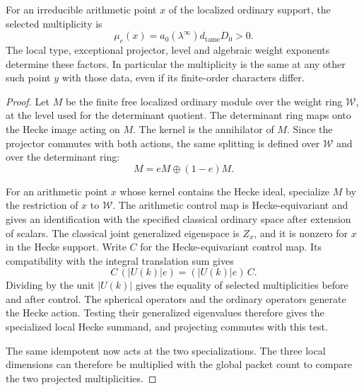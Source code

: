 \begin{proposition}\label{prop:ordinary-multiplicity-equal}
For an irreducible arithmetic point \(x\) of the localized
ordinary support, the selected multiplicity is
\[
 \mu_e(x)=a_0(\lambda^\infty)d_{\mathrm{tame}}D_0>0 .
\]
The local type, exceptional projector, level and algebraic
weight exponents determine these factors. In particular the
multiplicity is the same at any other such point \(y\) with
those data, even if its finite-order characters differ.
\end{proposition}

\begin{proof}
Let \(M\) be the finite free localized ordinary
module over the weight ring \(\mathcal W\),
at the level used for the determinant quotient.
The determinant ring maps onto the Hecke
image acting on \(M\). The kernel is the
annihilator of \(M\). Since the projector commutes with both actions, the same splitting is defined over \(\mathcal W\) and over the determinant ring:
\[
 M=eM\oplus(1-e)M .
\]

For an arithmetic point \(x\) whose kernel contains
the Hecke ideal, specialize \(M\) by the restriction
of \(x\) to \(\mathcal W\). The arithmetic
control map is Hecke-equivariant and gives an
identification with the specified classical
ordinary space after extension of scalars.
The classical joint generalized eigenspace
is \(Z_x\), and it is nonzero for \(x\)
in the Hecke support. Write \(C\) for the Hecke-equivariant control map. Its compatibility with the integral translation sum gives
\[
 C\,(|U(k)|e)=(|U(k)|e)\,C .
\] Dividing by the unit
\(|U(k)|\) gives the equality of selected
multiplicities before and after control.
The spherical operators and the ordinary
operators generate the Hecke action. Testing
their generalized eigenvalues therefore gives
the specialized local Hecke summand, and
projecting commutes with this test.

The same idempotent now acts at the two specializations. The three local dimensions can therefore be multiplied with the global packet count to compare the two projected multiplicities.


\end{proof}
